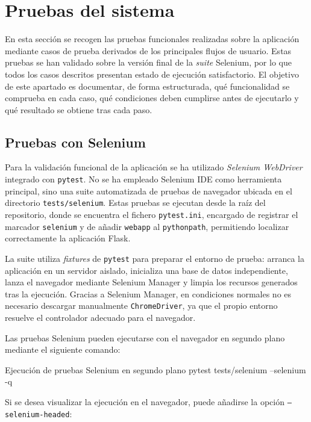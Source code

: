 \section{Pruebas del sistema}

En esta sección se recogen las pruebas funcionales realizadas sobre la aplicación mediante casos de prueba derivados de los principales flujos de usuario. Estas pruebas se han validado sobre la versión final de la \textit{suite} Selenium, por lo que todos los casos descritos presentan estado de ejecución satisfactorio. El objetivo de este apartado es documentar, de forma estructurada, qué funcionalidad se comprueba en cada caso, qué condiciones deben cumplirse antes de ejecutarlo y qué resultado se obtiene tras cada paso.

\subsection{Pruebas con Selenium}

Para la validación funcional de la aplicación se ha utilizado \textit{Selenium WebDriver} integrado con \texttt{pytest}. No se ha empleado Selenium IDE como herramienta principal, sino una suite automatizada de pruebas de navegador ubicada en el directorio \texttt{tests/selenium}. Estas pruebas se ejecutan desde la raíz del repositorio, donde se encuentra el fichero \texttt{pytest.ini}, encargado de registrar el marcador \texttt{selenium} y de añadir \texttt{webapp} al \texttt{pythonpath}, permitiendo localizar correctamente la aplicación Flask.

La suite utiliza \textit{fixtures} de \texttt{pytest} para preparar el entorno de prueba: arranca la aplicación en un servidor aislado, inicializa una base de datos independiente, lanza el navegador mediante Selenium Manager y limpia los recursos generados tras la ejecución. Gracias a Selenium Manager, en condiciones normales no es necesario descargar manualmente \texttt{ChromeDriver}, ya que el propio entorno resuelve el controlador adecuado para el navegador.

Las pruebas Selenium pueden ejecutarse con el navegador en segundo plano mediante el siguiente comando:

\begin{testbox}{Ejecución de pruebas Selenium en segundo plano}
pytest tests/selenium --selenium -q
\end{testbox}

Si se desea visualizar la ejecución en el navegador, puede añadirse la opción \texttt{--selenium-headed}:

